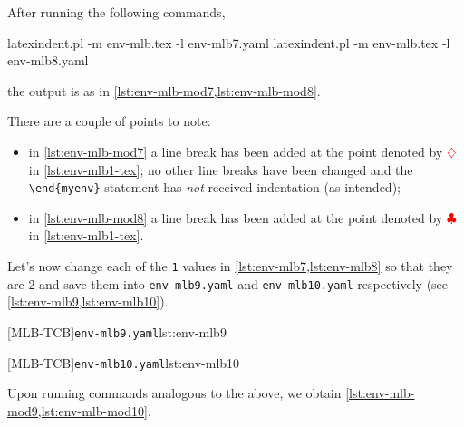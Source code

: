 	After running the following commands,
	\begin{commandshell}
latexindent.pl -m env-mlb.tex -l env-mlb7.yaml
latexindent.pl -m env-mlb.tex -l env-mlb8.yaml
\end{commandshell}
	the output is as in \cref{lst:env-mlb-mod7,lst:env-mlb-mod8}.

	\begin{widepage}
		\begin{minipage}{.42\linewidth}
		\end{minipage}
		\hfill
		\begin{minipage}{.57\linewidth}
		\end{minipage}
	\end{widepage}

	There are a couple of points to note:
	\begin{itemize}
		\item in \cref{lst:env-mlb-mod7} a line break has been added at the point denoted by $\color{red}\diamondsuit$ in \vref{lst:env-mlb1-tex}; no
		      other line breaks have been changed and the \lstinline!\end{myenv}! statement has \emph{not} received indentation (as intended);
		\item in \cref{lst:env-mlb-mod8} a line break has been added at the point denoted by $\color{red}\clubsuit$ in \vref{lst:env-mlb1-tex}.
	\end{itemize}

	Let's now change each of the \texttt{1} values in \cref{lst:env-mlb7,lst:env-mlb8} so that they are $2$ and
	save them into \texttt{env-mlb9.yaml} and \texttt{env-mlb10.yaml} respectively (see \cref{lst:env-mlb9,lst:env-mlb10}).

	\begin{minipage}{.49\textwidth}
		[MLB-TCB]{\texttt{env-mlb9.yaml}}{lst:env-mlb9}
	\end{minipage}
	\hfill
	\begin{minipage}{.49\textwidth}
		[MLB-TCB]{\texttt{env-mlb10.yaml}}{lst:env-mlb10}
	\end{minipage}

	Upon running  commands analogous to the above, we obtain \cref{lst:env-mlb-mod9,lst:env-mlb-mod10}.

